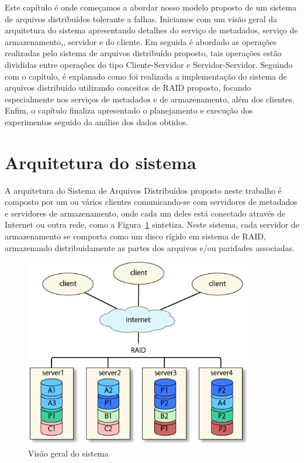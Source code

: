 Este capítulo é onde começamos a abordar nosso modelo proposto de um sistema de arquivos distribuídos tolerante a falhas. Iniciamos com um visão geral da arquitetura do sistema apresentando detalhes do serviço de metadados, serviço de armazenamento,, servidor e do cliente. Em seguida é abordado as operações realizadas pelo sistema de arquivos distribuído proposto, tais operações estão divididas entre operações do tipo Cliente-Servidor e Servidor-Servidor. Seguindo com o capítulo, é explanado como foi realizada a implementação do sistema de arquivos distribuído utilizando conceitos de RAID proposto, focando especialmente nos serviços de metadados e de armazenamento, além dos clientes. Enfim, o capítulo finaliza apresentado o planejamento e execução dos experimentos seguido da análise dos dados obtidos.


	\section{Arquitetura do sistema}
	
	A arquitetura do Sistema de Arquivos Distribuídos proposto neste trabalho é composto por um ou vários clientes comunicando-se com servidores de metadados e servidores de armazenamento, onde cada um deles está conectado através de Internet ou outra rede, como a Figura~\ref{fig:vis_sis}  sintetiza. Neste sistema, cada servidor de armazenamento se comporta como um disco rígido em sistema de RAID, armazenando distribuidamente as partes dos arquivos e/ou paridades associadas. \\
	
	


\begin{figure}[htb]
	\begin{center}
		
		\includegraphics[clip,width=10.0cm]{images/image1.png}
		\caption{Visão geral do sistema}
		\label{fig:vis_sis}
	\end{center}
\end{figure}

